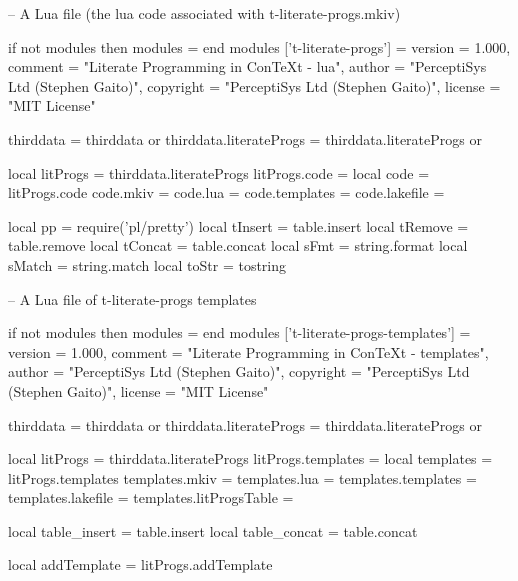 \usemodule[t-contests]

\unprotect

\stopMkIVCode

\startLuaCode
-- A Lua file (the lua code associated with t-literate-progs.mkiv)

if not modules then modules = { } end
modules ['t-literate-progs'] = {
    version   = 1.000,
    comment   = "Literate Programming in ConTeXt - lua",
    author    = "PerceptiSys Ltd (Stephen Gaito)",
    copyright = "PerceptiSys Ltd (Stephen Gaito)",
    license   = "MIT License"
}

thirddata               = thirddata               or {}
thirddata.literateProgs = thirddata.literateProgs or {}

local litProgs  = thirddata.literateProgs
litProgs.code   = {}
local code      = litProgs.code
code.mkiv       = {}
code.lua        = {}
code.templates  = {}
code.lakefile   = {}

local pp = require('pl/pretty')
local tInsert = table.insert
local tRemove = table.remove
local tConcat = table.concat
local sFmt    = string.format
local sMatch  = string.match
local toStr   = tostring
\stopLuaCode

\startLuaTemplate
-- A Lua file of t-literate-progs templates

if not modules then modules = { } end
modules ['t-literate-progs-templates'] = {
    version   = 1.000,
    comment   = "Literate Programming in ConTeXt - templates",
    author    = "PerceptiSys Ltd (Stephen Gaito)",
    copyright = "PerceptiSys Ltd (Stephen Gaito)",
    license   = "MIT License"
}

thirddata               = thirddata               or {}
thirddata.literateProgs = thirddata.literateProgs or {}

local litProgs          = thirddata.literateProgs
litProgs.templates      = {}
local templates         = litProgs.templates
templates.mkiv          = {}
templates.lua           = {}
templates.templates     = {}
templates.lakefile      = {}
templates.litProgsTable = {}

local table_insert = table.insert
local table_concat = table.concat

local addTemplate = litProgs.addTemplate
\stopLuaTemplate

\stopchapter